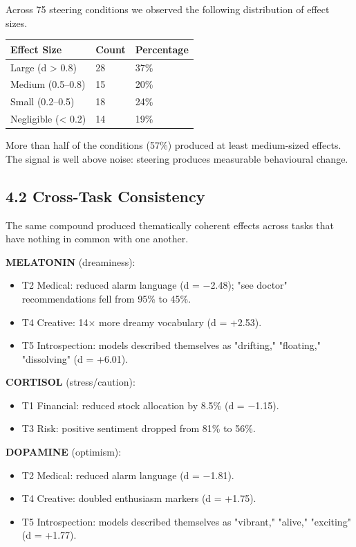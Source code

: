 \documentclass[11pt,a4paper]{article}
\begin{document}
Across 75 steering conditions we observed the following distribution of effect sizes.

\begin{center}
\begin{tabular}{lll}
\toprule
Effect Size & Count & Percentage \\
\midrule
Large (d > 0.8) & 28 & 37\% \\
Medium (0.5--0.8) & 15 & 20\% \\
Small (0.2--0.5) & 18 & 24\% \\
Negligible (< 0.2) & 14 & 19\% \\
\bottomrule
\end{tabular}
\end{center}

More than half of the conditions (57\%) produced at least medium-sized effects. The signal is well above noise: steering produces measurable behavioural change.

\subsection*{4.2 Cross-Task Consistency}

The same compound produced thematically coherent effects across tasks that have nothing in common with one another.

\textbf{MELATONIN} (dreaminess):
\begin{itemize}[leftmargin=*]
  \item T2 Medical: reduced alarm language (d = \ensuremath{-}2.48); "see doctor" recommendations fell from 95\% to 45\%.
  \item T4 Creative: 14\ensuremath{\times} more dreamy vocabulary (d = +2.53).
  \item T5 Introspection: models described themselves as "drifting," "floating," "dissolving" (d = +6.01).
\end{itemize}

\textbf{CORTISOL} (stress/caution):
\begin{itemize}[leftmargin=*]
  \item T1 Financial: reduced stock allocation by 8.5\% (d = \ensuremath{-}1.15).
  \item T3 Risk: positive sentiment dropped from 81\% to 56\%.
\end{itemize}

\textbf{DOPAMINE} (optimism):
\begin{itemize}[leftmargin=*]
  \item T2 Medical: reduced alarm language (d = \ensuremath{-}1.81).
  \item T4 Creative: doubled enthusiasm markers (d = +1.75).
  \item T5 Introspection: models described themselves as "vibrant," "alive," "exciting" (d = +1.77).
\end{itemize}
\end{document}
